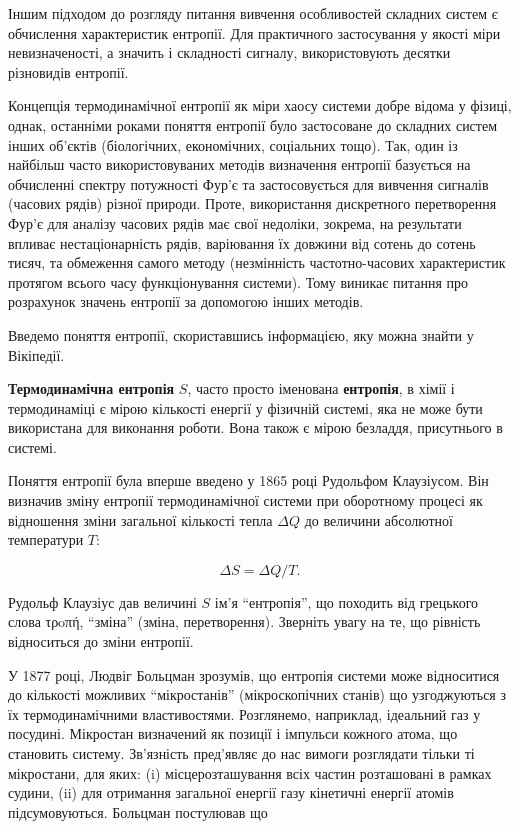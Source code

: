 \documentclass[
  letterpaper,
]{report}
\begin{document}
Іншим підходом до розгляду питання вивчення особливостей складних систем
є обчислення характеристик ентропії. Для практичного застосування у
якості міри невизначеності, а значить і складності сигналу,
використовують десятки різновидів ентропії.

Концепція термодинамічної ентропії як міри хаосу системи добре відома у
фізиці, однак, останніми роками поняття ентропії було застосоване до
складних систем інших об'єктів (біологічних, економічних, соціальних
тощо). Так, один із найбільш часто використовуваних методів визначення
ентропії базується на обчисленні спектру потужності Фур'є та
застосовується для вивчення сигналів (часових рядів) різної природи.
Проте, використання дискретного перетворення Фур'є для аналізу часових
рядів має свої недоліки, зокрема, на результати впливає нестаціонарність
рядів, варіювання їх довжини від сотень до сотень тисяч, та обмеження
самого методу (незмінність частотно-часових характеристик протягом
всього часу функціонування системи). Тому виникає питання про розрахунок
значень ентропії за допомогою інших методів.

Введемо поняття ентропії, скориставшись інформацією, яку можна знайти у
Вікіпедії.

\textbf{Термодинамічна ентропія} \(S\), часто просто іменована
\textbf{ентропія}, в хімії і термодинаміці є мірою кількості енергії у
фізичній системі, яка не може бути використана для виконання роботи.
Вона також є мірою безладдя, присутнього в системі.

Поняття ентропії була вперше введено у 1865 році Рудольфом Клаузіусом.
Він визначив зміну ентропії термодинамічної системи при оборотному
процесі як відношення зміни загальної кількості тепла \(\Delta Q\) до
величини абсолютної температури \(T\):

\[ 
\Delta S = \Delta Q / T. 
\]

Рудольф Клаузіус дав величині \(S\) ім'я ``ентропія'', що походить від
грецького слова τρoπή, ``зміна'' (зміна, перетворення). Зверніть увагу
на те, що рівність відноситься до зміни ентропії.

У 1877 році, Людвіг Больцман зрозумів, що ентропія системи може
відноситися до кількості можливих ``мікростанів'' (мікроскопічних
станів) що узгоджуються з їх термодинамічними властивостями. Розглянемо,
наприклад, ідеальний газ у посудині. Мікростан визначений як позиції і
імпульси кожного атома, що становить систему. Зв'язність пред'являє до
нас вимоги розглядати тільки ті мікростани, для яких: (i)
місцерозташування всіх частин розташовані в рамках судини, (ii) для
отримання загальної енергії газу кінетичні енергії атомів
підсумовуються. Больцман постулював що
\end{document}
